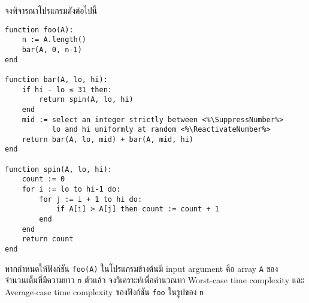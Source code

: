\question{}

จงพิจารณาโปรแกรมดังต่อไปนี้
\begin{lstlisting}
function foo(A):
    n := A.length()
    bar(A, 0, n-1)
end

function bar(A, lo, hi):
    if hi - lo ≤ 31 then:
        return spin(A, lo, hi)
    end
    mid := select an integer strictly between <%\SuppressNumber%>
           lo and hi uniformly at random <%\ReactivateNumber%>
    return bar(A, lo, mid) + bar(A, mid, hi)
end

function spin(A, lo, hi):
    count := 0
    for i := lo to hi-1 do:
        for j := i + 1 to hi do:
            if A[i] > A[j] then count := count + 1
        end
    end
    return count
end
\end{lstlisting}

หากกำหนดให้ฟังก์ชัน \lstinline{foo(A)} ในโปรแกรมข้างต้นมี input argument 
คือ array \lstinline{A} ของจำนวนเต็มที่มีความยาว \lstinline{n} ตัวแล้ว
จงวิเคราะห์เพื่อคํานวณหา Worst-case time complexity และ Average-case time complexity 
ของฟังก์ชัน \lstinline{foo} ในรูปของ \lstinline{n}

